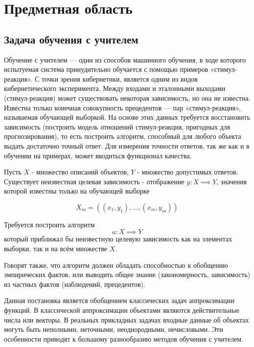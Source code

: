 \section{Предметная область}

\subsection{Задача обучения с учителем}

Обучение с учителем — один из способов машинного обучения, в ходе которого испытуемая система принудительно обучается с помощью примеров «стимул-реакция». С точки зрения кибернетики, является одним из видов кибернетического эксперимента. Между входами и эталонными выходами (стимул-реакция) может существовать некоторая зависимость, но она не известна. Известна только конечная совокупность прецедентов — пар «стимул-реакция», называемая обучающей выборкой. На основе этих данных требуется восстановить зависимость (построить модель отношений стимул-реакция, пригодных для прогнозирования), то есть построить алгоритм, способный для любого объекта выдать достаточно точный ответ. Для измерения точности ответов, так же как и в обучении на примерах, может вводиться функционал качества.

Пусть $X$ - множество описаний объектов, $Y$ - множество допустимых ответов. Существует неизвестная целевая зависимость - отображение $y: X \implies Y$, значения которой известны только на обучающей выборке 

\begin{equation}
  X_m=((x_1,y_1),...,(x_m,y_m))
\end{equation}

Требуется построить алгоритм 
\begin{equation}
  a: X \implies Y
\end{equation}
который приближал бы неизвестную целевую зависимость как на элементах выборки, так и на всём множестве $X$. 

Говорят также, что алгоритм должен обладать способностью к обобщению эмпирических фактов, или выводить общее знание (закономерность, зависимость) из частных фактов (наблюдений, прецедентов).

Данная постановка является обобщением классических задач аппроксимации функций. В классической аппроксимации объектами являются действительные числа или векторы. В реальных прикладных задачах входные данные об объектах могуть быть неполными, неточными, неоднородными, нечисловыми. Эти особенности приводят к большому разнообразию методов обучения с учителем. 

